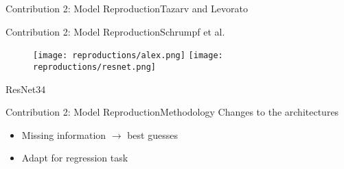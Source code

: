 \begin{frame}{Contribution 2: Model Reproduction}{Tazarv and Levorato}
    \begin{figure}
        
    \end{figure}
\end{frame}

\begin{frame}{Contribution 2: Model Reproduction}{Schrumpf et al.}
    \begin{figure}
        \centering
        \texttt{[image: reproductions/alex.png]}
        \texttt{[image: reproductions/resnet.png]}
    \end{figure}
    ResNet34
\end{frame}

\begin{frame}{Contribution 2: Model Reproduction}{Methodology}
    Changes to the architectures
    \begin{itemize}
        \item Missing information $\to$ best guesses
        \item Adapt for regression task
    \end{itemize}
\end{frame}
